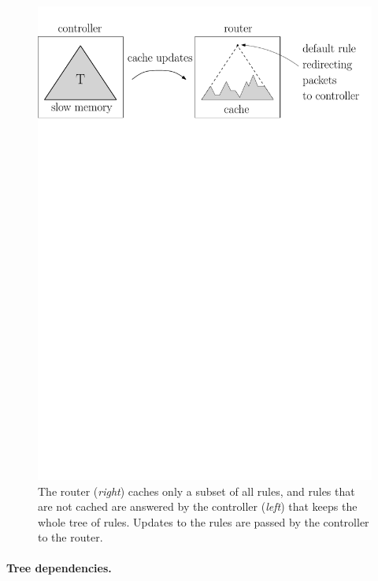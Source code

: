 \documentclass[sigconf,screen=true]{acmart}
\begin{document}
\begin{figure}[t]
  \centering
  \includegraphics[width=0.9\columnwidth,keepaspectratio]{images/router}
  \caption{The router (\emph{right}) caches only a subset of all rules, and
  rules that are not cached are answered by the controller (\emph{left}) that
  keeps the whole tree of rules. Updates to the rules are passed by the
  controller to the router.}
  \label{fig:motivation}
\end{figure}


\paragraph{Tree dependencies.}
\end{document}

